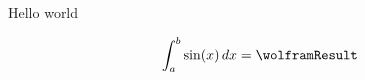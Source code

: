 \documentclass{article}
\begin{document}
Hello world





\ztikzHashCurrent* %
\[
  \int_a^b \sin(x)\,dx = \wolframResult
\]
\end{document}
